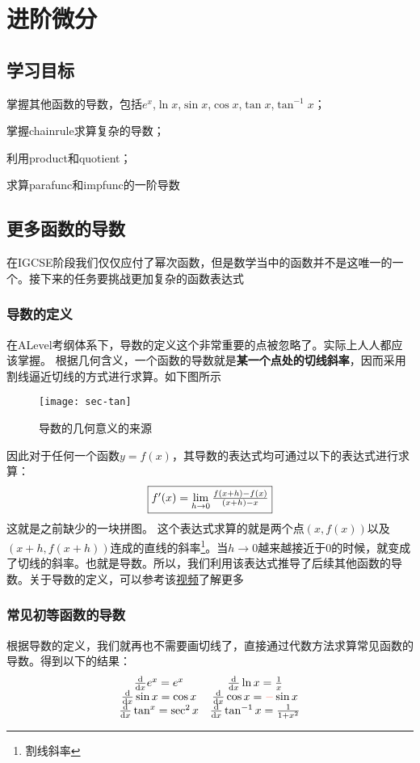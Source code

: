 \chapter{进阶微分}

\section*{学习目标}
\begin{todolist}
 \item 掌握其他函数的导数，包括$e^x$,$\ln x$,$\sin x$,$\cos x$,$\tan x$,$\tan^{-1} x$；
 \item 掌握\gls{chainrule}求算复杂的导数；
 \item 利用\gls{product}和\gls{quotient}；
 \item 求算\gls{parafunc}和\gls{impfunc}的一阶导数
\end{todolist}
\clearpage

\section{更多函数的导数}
在IGCSE阶段我们仅仅应付了幂次函数，但是数学当中的函数并不是这唯一的一个。接下来的任务要挑战更加复杂的函数表达式

\subsection*{导数的定义}
在ALevel考纲体系下，导数的定义这个非常重要的点被忽略了。实际上人人都应该掌握。
根据几何含义，一个函数的导数就是\textbf{某一个点处的切线斜率}，因而采用割线逼近切线的方式进行求算。如下图所示
\begin{figure}[H]
\centering
\texttt{[image: sec-tan]}
\caption{导数的几何意义的来源}
\end{figure}

因此对于任何一个函数$y=f(x)$，其导数的表达式均可通过以下的表达式进行求算：
\[
	\fbox{$f'(x)=\lim\limits_{h\to 0} \frac{f(x+h)-f(x)}{(x+h)-x}$}
\]
这就是之前缺少的一块拼图。
这个表达式求算的就是两个点$\left( x,f(x)\right)$以及$\left( x+h, f(x+h)\right)$连成的直线的斜率\footnote{割线斜率}。当$h\to 0$越来越接近于$0$的时候，就变成了切线的斜率。也就是导数。所以，我们利用该表达式推导了后续其他函数的导数。关于导数的定义，可以参考该\href{https://www.bilibili.com/video/BV1c7411D74J}{视频}了解更多

\subsection*{常见初等函数的导数}
根据导数的定义，我们就再也不需要画切线了，直接通过代数方法求算常见函数的导数。得到以下的结果：\\
\[

\begin{matrix}
 \frac{\d}{\d x}e^x=e^x  & \frac{\d}{\d x}\ln x=\frac{1}{x}\\
 \frac{\d}{\d x}\sin x=\cos x & \frac{\d}{\d x} \cos x=\textcolor{r1}{-}\sin x  \\
 \frac{\d}{\d x}\tan^x=\sec^2 x &\frac{\d}{\d x}\tan^{-1}x=\frac{1}{1+x^2}
\end{matrix}

\]

